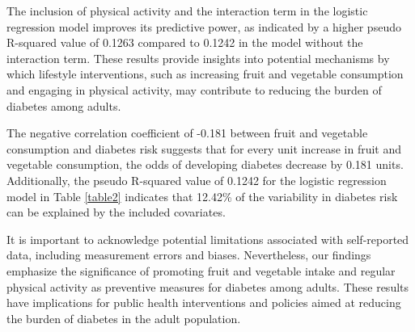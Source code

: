 \documentclass[11pt]{article}
\begin{document}
The inclusion of physical activity and the interaction term in the logistic regression model improves its predictive power, as indicated by a higher pseudo R-squared value of 0.1263 compared to 0.1242 in the model without the interaction term. These results provide insights into potential mechanisms by which lifestyle interventions, such as increasing fruit and vegetable consumption and engaging in physical activity, may contribute to reducing the burden of diabetes among adults.

The negative correlation coefficient of -0.181 between fruit and vegetable consumption and diabetes risk suggests that for every unit increase in fruit and vegetable consumption, the odds of developing diabetes decrease by 0.181 units. Additionally, the pseudo R-squared value of 0.1242 for the logistic regression model in Table \ref{table2} indicates that 12.42\% of the variability in diabetes risk can be explained by the included covariates.

It is important to acknowledge potential limitations associated with self-reported data, including measurement errors and biases. Nevertheless, our findings emphasize the significance of promoting fruit and vegetable intake and regular physical activity as preventive measures for diabetes among adults. These results have implications for public health interventions and policies aimed at reducing the burden of diabetes in the adult population.
\end{document}

